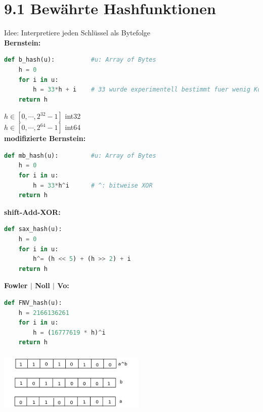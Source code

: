 \documentclass[11pt, fleqn]{scrreprt}
\begin{document}
\section*{9.1 Bewährte Hashfunktionen}
Idee: Interpretiere jeden Schlüssel als Bytefolge\\

\textbf{Bernstein:}
\begin{lstlisting}[language=Python]
def b_hash(u):  		#u: Array of Bytes
	h = 0
	for i in u:
		h = 33*h + i    # 33 wurde experimentell bestimmt fuer wenig Kollision
	return h
\end{lstlisting}
$h \in [0, \cdots, 2^{32} -1]$ int32 \\
$h \in [0, \cdots, 2^{64} -1]$ int64 \\


\textbf{modifizierte Bernstein:}
\begin{lstlisting}[language=Python]
def mb_hash(u):  		#u: Array of Bytes
	h = 0
	for i in u:
		h = 33*h^i    	# ^: bitweise XOR
	return h
\end{lstlisting}

\textbf{shift-Add-XOR:}
\begin{lstlisting}[language=Python]
def sax_hash(u):
	h = 0
	for i in u:
		h^= (h << 5) + (h >> 2) + i
	return h
\end{lstlisting}

\textbf{Fowler $|$ Noll $|$ Vo:}
\begin{lstlisting}[language=Python]
def FNV_hash(u):
	h = 2166136261
	for i in u:
		h = (16777619 * h)^i
	return h
\end{lstlisting}
\includegraphics[width=7cm,height=3cm,keepaspectratio]{./Pictures/abArrays.png}
\end{document}
